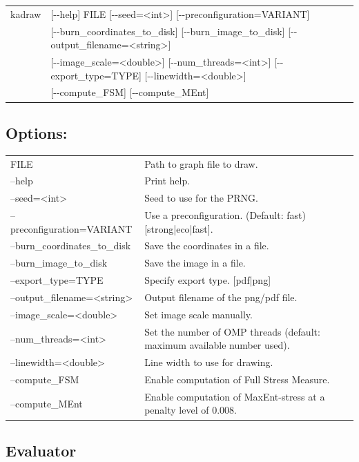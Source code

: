 \documentclass[11pt]{article}
\begin{document}
\begin{tabular}{ll}
kadraw &   [-{}-help] FILE [-{}-seed=<int>] [-{}-preconfiguration=VARIANT]  \\
& [-{}-burn\_coordinates\_to\_disk] [-{}-burn\_image\_to\_disk] [-{}-output\_filename=<string>] \\ 
& [-{}-image\_scale=<double>] [-{}-num\_threads=<int>] [-{}-export\_type=TYPE] [-{}-linewidth=<double>] \\ 
& [-{}-compute\_FSM] [-{}-compute\_MEnt]

\end{tabular}
                          
\subsection*{Options:\\}

\begin{tabularx}{\textwidth}{lX}
  FILE                          & Path to graph file to draw.\\
  --help                        & Print help. \\
  --seed=<int>                  & Seed to use for the PRNG.\\
  --preconfiguration=VARIANT    & Use a preconfiguration. (Default: fast) [strong|eco|fast].\\
  --burn\_coordinates\_to\_disk & Save the coordinates in a file.\\
  --burn\_image\_to\_disk       & Save the image in a file.\\
  --export\_type=TYPE           & Specify export type. [pdf|png]\\
  --output\_filename=<string>   & Output filename of the png/pdf file.\\
  --image\_scale=<double>       & Set image scale manually.\\
  --num\_threads=<int>          & Set the number of OMP threads (default: maximum available number used).\\
  --linewidth=<double>          & Line width to use for drawing.\\
  --compute\_FSM                & Enable computation of Full Stress Measure.\\
  --compute\_MEnt               & Enable computation of MaxEnt-stress at a penalty level of 0.008.\\
\end{tabularx}
\vfill
\pagebreak
\subsection{Evaluator}
\end{document}
